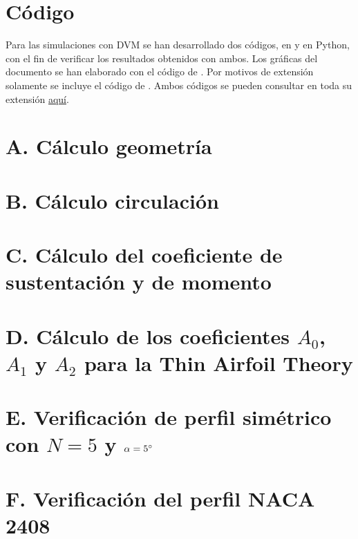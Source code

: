 
\appendix

\section*{\textbf{Código \MATLAB}}

Para las simulaciones con DVM se han desarrollado dos códigos, en \MATLAB y en Python, con el fin de verificar los resultados obtenidos con ambos. Los gráficas del documento se han elaborado con el código de \MATLAB. Por motivos de extensión solamente se incluye el código de \MATLAB. Ambos códigos se pueden consultar en toda su extensión \href{https://github.com/plosan/aerodynamics_homework_1}{aquí}.


\section*{A. Cálculo geometría}


\newpage
\section*{B. Cálculo circulación}


\section*{C. Cálculo del coeficiente de sustentación y de momento}


\section*{D. Cálculo de los coeficientes \(A_0\), \(A_1\) y \(A_2\) para la Thin Airfoil Theory}


\section*{E. Verificación de perfil simétrico con $N = 5$ y $\alpha = 5 \mathrm{^{\circ}}$}


\section*{F. Verificación del perfil NACA 2408}


